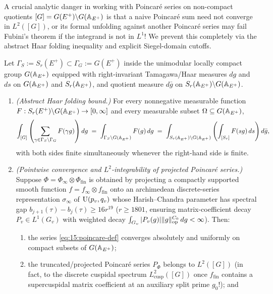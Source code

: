 A crucial analytic danger in working with Poincar\'e series on non-compact quotients $[G] = G(E^+)\backslash G(\mathbb{A}_{E^+})$ is that a naive Poincar\'e sum need not converge in $L^2([G])$, or its formal unfolding against another Poincar\'e series may fail Fubini's theorem if the integrand is not in $L^1$! We prevent this completely via the abstract Haar folding inequality and explicit Siegel-domain cutoffs.

\begin{proposition}
\label{prop:15:fold-l2}
Let $\Gamma_S := S_r(E^+) \subset \Gamma_G := G(E^+)$ inside the unimodular locally compact group $G(\mathbb{A}_{E^+})$ equipped with right-invariant Tamagawa/Haar measures $dg$ and $ds$ on $G(\mathbb{A}_{E^+})$ and $S_r(\mathbb{A}_{E^+})$, and quotient measure $d\bar{g}$ on $S_r(\mathbb{A}_{E^+}) \backslash G(\mathbb{A}_{E^+})$.
\begin{enumerate}[label=\textup{(\roman*)}]
\item \emph{(Abstract Haar folding bound.)} For every nonnegative measurable function $F : S_r(E^+) \backslash G(\mathbb{A}_{E^+}) \to [0, \infty]$ and every measurable subset $\Omega \subseteq G(\mathbb{A}_{E^+})$,
  \begin{equation}
  \label{eq:15:fold-bound}
    \int_{[G]} \left(\sum_{\gamma \in \Gamma_S \backslash \Gamma_G} F(\gamma g)\right) dg
    \;=\; \int_{\Gamma_S \backslash G(\mathbb{A}_{E^+})} F(g)\, dg
    \;=\; \int_{S_r(\mathbb{A}_{E^+}) \backslash G(\mathbb{A}_{E^+})} \left(\int_{[S_r]} F(s g)\, ds\right) d\bar{g},
  \end{equation}
  with both sides finite simultaneously whenever the right-hand side is finite.
\item \emph{(Pointwise convergence and $L^2$-integrability of projected Poincar\'e series.)} Suppose $\Phi = \Phi_\infty \otimes \Phi_{\mathrm{fin}}$ is obtained by projecting a compactly supported smooth function $f = f_\infty \otimes f_{\mathrm{fin}}$ onto an archimedean discrete-series representation $\sigma_\infty$ of $\mathrm{U}(p_v, q_v)$ whose Harish--Chandra parameter has spectral gap $b_{j+1}(\tau) - b_j(\tau) \ge 16 r^{19}$ ($r \ge 1801$, ensuring matrix-coefficient decay $P_v \in L^1(G_v)$ with weighted decay $\int_{G_v} |P_v(g)| \|g\|_{\mathrm{op}}^{C_0}\, dg < \infty$). Then:
  \begin{enumerate}[label=\textup{(\alph*)}]
  \item the series \eqref{eq:15:poincare-def} converges absolutely and uniformly on compact subsets of $G(\mathbb{A}_{E^+})$;
  \item the truncated/projected Poincar\'e series $P_\Phi$ belongs to $L^2([G])$ (in fact, to the discrete cuspidal spectrum $L^2_{\mathrm{cusp}}([G])$ once $f_{\mathrm{fin}}$ contains a supercuspidal matrix coefficient at an auxiliary split prime $g_0$!); and

\end{enumerate}
\end{enumerate}
\end{proposition}
